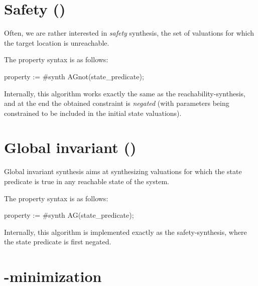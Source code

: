 \section{Safety ()}\label{section:algorithm:AGnot}

Often, we are rather interested in \emph{safety} synthesis, \ie{} the set of valuations for which the target location is unreachable.

The property syntax is as follows:

\begin{IMITATORproperty}
property := #synth AGnot(state_predicate);
\end{IMITATORproperty}

Internally, this algorithm works exactly the same as the reachability-synthesis, and at the end the obtained constraint is \emph{negated} (with parameters being constrained to be included in the initial state valuations).


\section{Global invariant ()}\label{section:algorithm:AG}

Global invariant synthesis aims at synthesizing valuations for which the state predicate is true in any reachable state of the system.

The property syntax is as follows:

\begin{IMITATORproperty}
property := #synth AG(state_predicate);
\end{IMITATORproperty}

Internally, this algorithm is implemented exactly as the safety-synthesis, where the state predicate is first negated.



\section{-minimization}\label{section:algorithm:EFmin}

